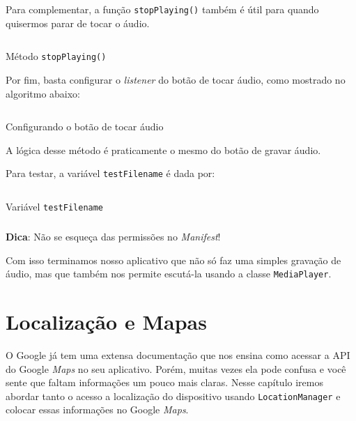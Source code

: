 \documentclass[a4paper,12pt,brazil,oneside]{book}
\begin{document}
		Para complementar, a função \texttt{stopPlaying()} também é útil para quando quisermos parar de tocar o áudio.
		
		\begin{listing}[H]
		\inputminted[linenos=true,fontsize=\small,frame=lines, framesep=2mm, tabsize=2,numbersep=5pt]{java}{src/api/audio/stoplaying.java}
		\caption{Método \texttt{stopPlaying()}}
		\label{code:audiostopplaying}
		\end{listing} 		

		Por fim, basta configurar o \emph{listener} do botão de tocar áudio, como mostrado no algoritmo abaixo:

		\begin{listing}[H]
		\inputminted[linenos=true,fontsize=\small,frame=lines, framesep=2mm, tabsize=2,numbersep=5pt]{java}{src/api/audio/playlistener.java}
		\caption{Configurando o botão de tocar áudio}
		\label{code:audioplaylistener}
		\end{listing} 		

		A lógica desse método é praticamente o mesmo do botão de gravar áudio. 

		Para testar, a variável \texttt{testFilename} é dada por:

		\begin{listing}[H]
		\inputminted[linenos=true,fontsize=\small,frame=lines, framesep=2mm, tabsize=2,numbersep=5pt]{java}{src/api/audio/testfilename.java}
		\caption{Variável \texttt{testFilename}}
		\label{code:audiofile}
		\end{listing} 		

\begin{framed}
\paragraph{}\textbf{Dica}: Não se esqueça das permissões no \emph{Manifest}!
\textit{}
\end{framed}

		Com isso terminamos nosso aplicativo que não só faz uma simples gravação de áudio, mas que também nos permite escutá-la usando a classe \texttt{MediaPlayer}.



\chapter{Localização e Mapas}

		O Google já tem uma extensa documentação que nos ensina como acessar a API do Google \emph{Maps} no seu aplicativo. Porém, muitas vezes ela pode confusa e você sente que faltam informações um pouco mais claras. Nesse capítulo iremos abordar tanto o acesso a localização do dispositivo usando \texttt{LocationManager} e colocar essas informações no Google \emph{Maps}.
\end{document}
